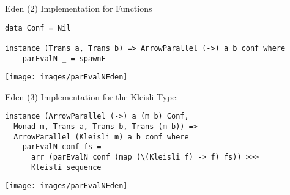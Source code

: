 \begin{frame}[fragile]{Eden (2)}
Implementation for Functions
\begin{lstlisting}[frame=htrbl]
data Conf = Nil

instance (Trans a, Trans b) => ArrowParallel (->) a b conf where
	parEvalN _ = spawnF
\end{lstlisting}
\begin{center}
\texttt{[image: images/parEvalNEden]}
\end{center}
\end{frame}

\begin{frame}[fragile]{Eden (3)}
Implementation for the Kleisli Type:
\begin{lstlisting}[frame=htrbl]
instance (ArrowParallel (->) a (m b) Conf,
  Monad m, Trans a, Trans b, Trans (m b)) =>
  ArrowParallel (Kleisli m) a b conf where
    parEvalN conf fs = 
      arr (parEvalN conf (map (\(Kleisli f) -> f) fs)) >>>
      Kleisli sequence
\end{lstlisting}
\begin{center}
\texttt{[image: images/parEvalNEden]}
\end{center}
\end{frame}